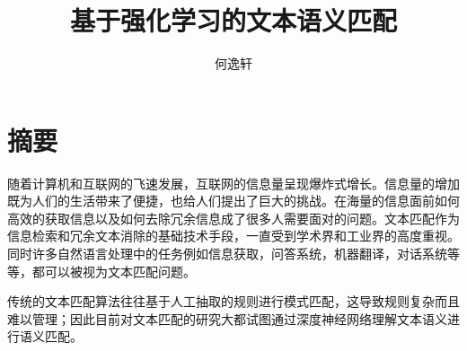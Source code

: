 \confidential{}%
\title{基于强化学习的文本语义匹配}%
\author{何逸轩}%
\maketitle
\makeenglishtitle
\makedeclaration
\chapter*{摘\quad 要}
\setcounter{page}{1}%

随着计算机和互联网的飞速发展，互联网的信息量呈现爆炸式增长。信息量的增加既为人们的生活带来了便捷，也给人们提出了巨大的挑战。在海量的信息面前如何高效的获取信息以及如何去除冗余信息成了很多人需要面对的问题。文本匹配作为信息检索和冗余文本消除的基础技术手段，一直受到学术界和工业界的高度重视。同时许多自然语言处理中的任务例如信息获取，问答系统，机器翻译，对话系统等等，都可以被视为文本匹配问题。

传统的文本匹配算法往往基于人工抽取的规则进行模式匹配，这导致规则复杂而且难以管理；因此目前对文本匹配的研究大都试图通过深度神经网络理解文本语义进行语义匹配。


